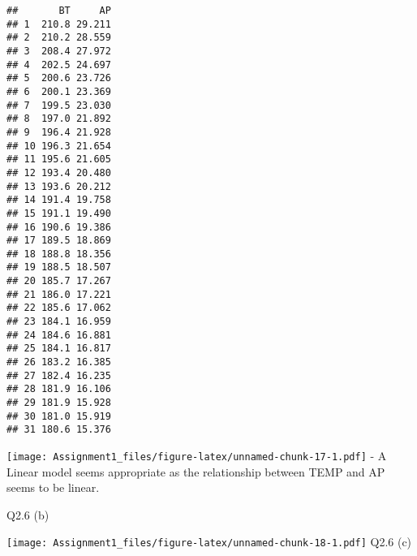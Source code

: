 \documentclass[
]{article}
\newenvironment{Shaded}{\begin{snugshade}}{\end{snugshade}}
\newcommand{\AttributeTok}[1]{\textcolor[rgb]{0.13,0.29,0.53}{#1}}
\newcommand{\CommentTok}[1]{\textcolor[rgb]{0.56,0.35,0.01}{\textit{#1}}}
\newcommand{\DecValTok}[1]{\textcolor[rgb]{0.00,0.00,0.81}{#1}}
\newcommand{\FunctionTok}[1]{\textcolor[rgb]{0.13,0.29,0.53}{\textbf{#1}}}
\newcommand{\NormalTok}[1]{#1}
\newcommand{\OtherTok}[1]{\textcolor[rgb]{0.56,0.35,0.01}{#1}}
\newcommand{\SpecialCharTok}[1]{\textcolor[rgb]{0.81,0.36,0.00}{\textbf{#1}}}
\newcommand{\StringTok}[1]{\textcolor[rgb]{0.31,0.60,0.02}{#1}}
\begin{document}
\begin{verbatim}
##       BT     AP
## 1  210.8 29.211
## 2  210.2 28.559
## 3  208.4 27.972
## 4  202.5 24.697
## 5  200.6 23.726
## 6  200.1 23.369
## 7  199.5 23.030
## 8  197.0 21.892
## 9  196.4 21.928
## 10 196.3 21.654
## 11 195.6 21.605
## 12 193.4 20.480
## 13 193.6 20.212
## 14 191.4 19.758
## 15 191.1 19.490
## 16 190.6 19.386
## 17 189.5 18.869
## 18 188.8 18.356
## 19 188.5 18.507
## 20 185.7 17.267
## 21 186.0 17.221
## 22 185.6 17.062
## 23 184.1 16.959
## 24 184.6 16.881
## 25 184.1 16.817
## 26 183.2 16.385
## 27 182.4 16.235
## 28 181.9 16.106
## 29 181.9 15.928
## 30 181.0 15.919
## 31 180.6 15.376
\end{verbatim}

\begin{Shaded}
\end{Shaded}

\texttt{[image: Assignment1\_files/figure-latex/unnamed-chunk-17-1.pdf]}
- A Linear model seems appropriate as the relationship between TEMP and
AP seems to be linear.

Q2.6 (b)

\begin{Shaded}
\end{Shaded}

\texttt{[image: Assignment1\_files/figure-latex/unnamed-chunk-18-1.pdf]}
Q2.6 (c)
\end{document}
